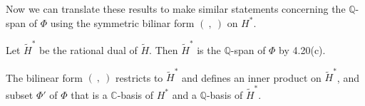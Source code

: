 Now we can translate these results to make similar statements concerning the
$\mathbb{Q}$-span of $\Phi$ using the symmetric bilinar form $(\ ,\ )$ on $H^*$.

Let $\tilde{H}^*$ be the rational dual of $\tilde{H}.$
Then $\tilde{H}^*$ is the $\mathbb{Q}$-span of $\Phi$ by 4.20(c).

The bilinear form $(\ ,\ )$ restricts to $\tilde{H}^*$ and defines an
inner product on $\tilde{H}^*$, and subset $\Phi'$ of $\Phi$ that
is a $\mathbb{C}$-basis of $H^*$ and a $\mathbb{Q}$-basis of
$\tilde{H}^*$.
